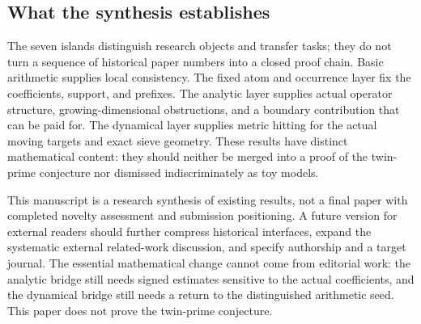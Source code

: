 \subsection{What the synthesis establishes}
The seven islands distinguish research objects and transfer tasks; they do not turn a sequence of historical paper numbers into a closed proof chain.
Basic arithmetic supplies local consistency. The fixed atom and occurrence layer fix the coefficients, support, and prefixes. The analytic layer supplies actual operator structure, growing-dimensional obstructions, and a boundary contribution that can be paid for. The dynamical layer supplies metric hitting for the actual moving targets and exact sieve geometry.
These results have distinct mathematical content: they should neither be merged into a proof of the twin-prime conjecture nor dismissed indiscriminately as toy models.

This manuscript is a research synthesis of existing results, not a final paper with completed novelty assessment and submission positioning.
A future version for external readers should further compress historical interfaces, expand the systematic external related-work discussion, and specify authorship and a target journal.
The essential mathematical change cannot come from editorial work: the analytic bridge still needs signed estimates sensitive to the actual coefficients, and the dynamical bridge still needs a return to the distinguished arithmetic seed. This paper does not prove the twin-prime conjecture.
